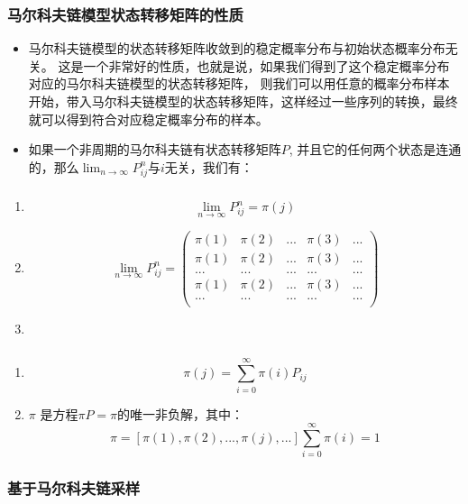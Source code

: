 \begin{frame}
  \frametitle{马尔科夫链模型状态转移矩阵的性质}
  \begin{itemize}
    \item 马尔科夫链模型的状态转移矩阵收敛到的稳定概率分布与初始状态概率分布无关。
    这是一个非常好的性质，也就是说，如果我们得到了这个稳定概率分布对应的马尔科夫链模型的状态转移矩阵，
    则我们可以用任意的概率分布样本开始，带入马尔科夫链模型的状态转移矩阵，这样经过一些序列的转换，最终就可以得到符合对应稳定概率分布的样本。
    \item 如果一个非周期的马尔科夫链有状态转移矩阵$P$, 并且它的任何两个状态是连通的，那么$\lim_{n \to \infty} P_{ij}^n$与$i$无关，我们有：
  \end{itemize}

\end{frame}

\begin{frame}
  \frametitle{}
  \begin{enumerate}
    \item $$\lim_{n \to \infty} P_{ij}^n = \pi(j)$$
    \item $$\lim_{n \to \infty} P_{ij}^n = 
    \begin{pmatrix}
      \pi(1) &\pi(2)&...&\pi(3)&...\\
      \pi(1) &\pi(2)&...&\pi(3)&...\\
      ... &...&...&...&...\\
      \pi(1) &\pi(2)&...&\pi(3)&...\\
      ... &...&...&...&...\\
    \end{pmatrix}
    $$
    \item 
  \end{enumerate}
  
\end{frame}

\begin{frame}
  \frametitle{}
  \begin{enumerate}
    \item $$\pi(j) = \sum_{i=0}^\infty \pi(i)P_{ij}$$
    \item $\pi$ 是方程$\pi P = \pi$的唯一非负解，其中：$$\pi = [\pi(1), \pi(2),...,\pi(j), ...] \sum_{i=0}^\infty \pi(i) = 1$$
  \end{enumerate}
  
\end{frame}

\begin{frame}
  \frametitle{基于马尔科夫链采样}
  
\end{frame}